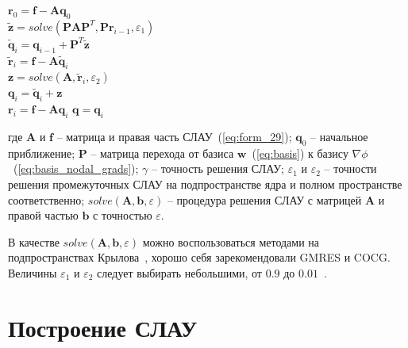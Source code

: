 \documentclass[a4paper,14pt]{article}
\begin{document}
\vspace{1em}
\begin{algorithm}[H]
	\SetAlgoLined
	$\mathbf{r}_0 = \mathbf{f} - \mathbf{A} \mathbf{q}_0$ \\
	{
		$\tilde{\mathbf{z}} = solve(\mathbf{P} \mathbf{A} \mathbf{P}^T , \mathbf{P} \mathbf{r}_{i-1} , \varepsilon_1 )$ \\
		$\tilde{\mathbf{q}}_{i} = \mathbf{q}_{i-1} + \mathbf{P}^T \tilde{\mathbf{z}}$ \\
		$\tilde{\mathbf{r}}_{i} = \mathbf{f} - \mathbf{A} \tilde{\mathbf{q}}_{i}$ \\
		$\mathbf{z} = solve(\mathbf{A}, \tilde{\mathbf{r}}_{i}, \varepsilon_2)$ \\
		$\mathbf{q}_{i} = \tilde{\mathbf{q}}_{i} + \mathbf{z}$ \\
		$\mathbf{r}_{i} = \mathbf{f} - \mathbf{A} \mathbf{q}_{i}$
	}
	$\mathbf{q} = \mathbf{q}_{i}$
\end{algorithm}
\vspace{1em}

\noindent где $\mathbf{A}$ и $\mathbf{f}$ -- матрица и правая часть СЛАУ~(\ref{eq:form_29}); $\mathbf{q}_0$ -- начальное приближение;  $\mathbf{P}$ -- матрица перехода от базиса $\mathbf{w}$~(\ref{eq:basis}) к базису $\nabla \phi$~(\ref{eq:basis_nodal_grads}); $\gamma$ -- точность решения СЛАУ; $\varepsilon_1$ и $\varepsilon_2$ -- точности решения промежуточных СЛАУ на подпространстве ядра и полном пространстве соответственно; $solve(\mathbf{A}, \mathbf{b}, \varepsilon)$ -- процедура решения СЛАУ с матрицей $\mathbf{A}$ и правой частью $\mathbf{b}$ с точностью $\varepsilon$.

В качестве $solve(\mathbf{A}, \mathbf{b}, \varepsilon)$ можно воспользоваться методами на подпространствах Крылова~\citep{balandin_slae, solver_saad, solver_iterative, solver_templates}, хорошо себя зарекомендовали GMRES и COCG. Величины $\varepsilon_1$ и $\varepsilon_2$ следует выбирать небольшими, от $0.9$ до $0.01$~\citep{nechaev}.
%


\clearpage
\section{Построение СЛАУ}
\end{document}
